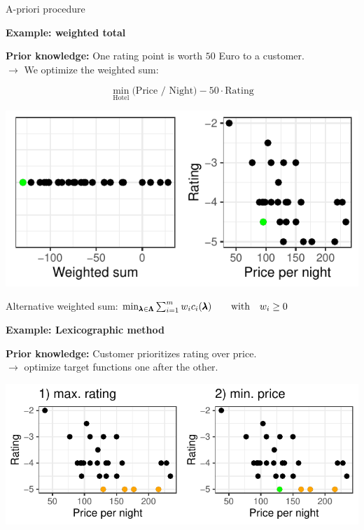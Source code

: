 \begin{frame}[allowframebreaks]{A-priori procedure}

\textbf{Example: weighted total}


\textbf{Prior knowledge:} One rating point is worth $50$ Euro to a customer. \\ $\to$ We optimize the weighted sum:

$$
\min_\text{Hotel} \text{(Price / Night)} - 50 \cdot \text{Rating}
$$

    \begin{center}
\includegraphics[scale=0.555555]{images/expedia-9-1}
    \end{center}

    Alternative weighted sum: $\min_{\pmb{\lambda} \in \pmb{\Lambda}} \sum_{i = 1}^m w_i c_i(\pmb{\lambda}) \qquad \text{with} \quad w_i \ge 0 $

\framebreak

\textbf{Example: Lexicographic method}

\textbf{Prior knowledge:} Customer prioritizes rating over price. \\
$\to$ optimize target functions one after the other.


    \begin{center}
\includegraphics[scale=1]{images/expedia-10-1}
    \end{center}


\end{frame}
